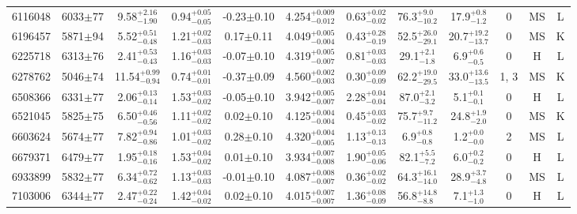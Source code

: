 \begin{landscape}
\begin{longtable}{c|ccccc|ccc|ccc}
	6116048 & 6033$\pm$77    & 9.58$_{-1.90}^{+2.16}$    & 0.94$_{-0.05}^{+0.05}$ & -0.23$\pm$0.10    & 4.254$_{-0.012}^{+0.009}$ & 0.63$_{-0.02}^{+0.02}$ & 76.3$_{-10.2}^{+9.0}$     & 17.9$_{-1.2}^{+0.8}$     & 0 &        MS & L \\
	6196457 & 5871$\pm$94    & 5.52$_{-0.48}^{+0.51}$    & 1.21$_{-0.03}^{+0.02}$ & 0.17$\pm$0.11     & 4.049$_{-0.004}^{+0.005}$ & 0.43$_{-0.19}^{+0.28}$ & 52.5$_{-29.1}^{+26.0}$    & 20.7$_{-13.7}^{+19.2}$   & 0 &        MS & K \\
	6225718 & 6313$\pm$76    & 2.41$_{-0.43}^{+0.53}$    & 1.16$_{-0.03}^{+0.03}$ & -0.07$\pm$0.10    & 4.319$_{-0.007}^{+0.005}$ & 0.81$_{-0.03}^{+0.03}$ & 29.1$_{-1.8}^{+2.1}$      & 6.9$_{-0.5}^{+0.6}$      & 0 &        H & L \\
	6278762 & 5046$\pm$74    & 11.54$_{-0.94}^{+0.99}$   & 0.74$_{-0.01}^{+0.01}$ & -0.37$\pm$0.09    & 4.560$_{-0.003}^{+0.002}$ & 0.30$_{-0.09}^{+0.09}$ & 62.2$_{-29.5}^{+19.0}$    & 33.0$_{-13.5}^{+13.6}$   & 1, 3 &        MS & K \\
	6508366 & 6331$\pm$77    & 2.06$_{-0.14}^{+0.13}$    & 1.53$_{-0.02}^{+0.03}$ & -0.05$\pm$0.10    & 3.942$_{-0.007}^{+0.005}$ & 2.28$_{-0.04}^{+0.04}$ & 87.0$_{-3.2}^{+2.1}$      & 5.1$_{-0.1}^{+0.1}$      & 0 &        H & L \\
	6521045 & 5825$\pm$75    & 6.50$_{-0.56}^{+0.46}$    & 1.11$_{-0.02}^{+0.02}$ & 0.02$\pm$0.10     & 4.125$_{-0.004}^{+0.004}$ & 0.45$_{-0.02}^{+0.03}$ & 75.7$_{-11.2}^{+9.7}$     & 24.8$_{-2.0}^{+1.9}$     & 0 &        MS & K \\
	6603624 & 5674$\pm$77    & 7.82$_{-0.86}^{+0.94}$    & 1.01$_{-0.02}^{+0.03}$ & 0.28$\pm$0.10     & 4.320$_{-0.005}^{+0.004}$ & 1.13$_{-0.13}^{+0.13}$ & 6.9$_{-0.8}^{+0.8}$       & 1.2$_{-0.0}^{+0.0}$      & 2 &        MS & L \\
	6679371 & 6479$\pm$77    & 1.95$_{-0.16}^{+0.18}$    & 1.53$_{-0.02}^{+0.04}$ & 0.01$\pm$0.10     & 3.934$_{-0.008}^{+0.007}$ & 1.90$_{-0.06}^{+0.05}$ & 82.1$_{-7.2}^{+5.5}$      & 6.0$_{-0.2}^{+0.2}$      & 0 &        H & L \\
	6933899 & 5832$\pm$77    & 6.34$_{-0.62}^{+0.72}$    & 1.13$_{-0.03}^{+0.03}$ & -0.01$\pm$0.10    & 4.087$_{-0.007}^{+0.008}$ & 0.36$_{-0.02}^{+0.02}$ & 64.3$_{-14.0}^{+16.1}$    & 28.9$_{-4.8}^{+3.7}$     & 0 &        MS & L \\
	7103006 & 6344$\pm$77    & 2.47$_{-0.24}^{+0.22}$    & 1.42$_{-0.02}^{+0.04}$ & 0.02$\pm$0.10     & 4.015$_{-0.007}^{+0.007}$ & 1.36$_{-0.09}^{+0.08}$ & 56.8$_{-8.8}^{+14.8}$     & 7.1$_{-1.0}^{+1.3}$      & 0 &        H & L \\

\end{longtable}
\end{landscape}
